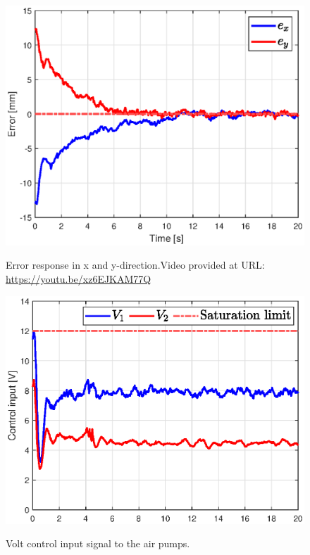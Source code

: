 \begin{figure}[H] 
    \begin{minipage}[b]{0.49\linewidth}
     \centering
    \includegraphics[width=\linewidth]{Figures/Chapter5/errrorstepleft.eps} 
    \caption{Error response in x and y-direction.Video provided at URL: \url{https://youtu.be/xz6EJKAM77Q}} 
    \label{fig5:errorswingleft} 
       \end{minipage} 
    \begin{minipage}[b]{0.49\linewidth}
     \centering
    \includegraphics[width=\linewidth]{Figures/Chapter5/controlinputstepleftV.eps} 
    \caption{Volt control input signal to the air pumps.} 
    \vspace{12pt}
    \label{fig5:inputswingleft} 
    \end{minipage} 
\end{figure}

